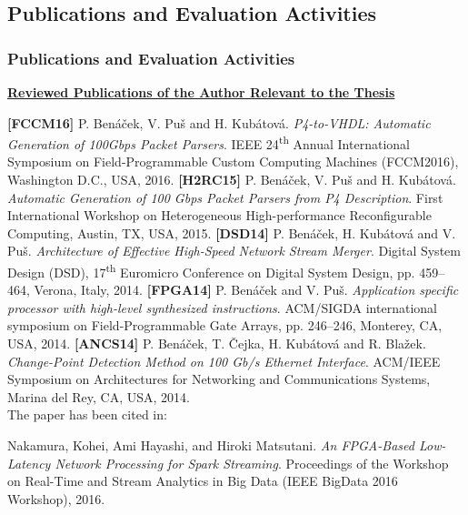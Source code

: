 \subsection*{Publications and Evaluation Activities}
\begin{frame}[allowframebreaks]
    \frametitle{Publications and Evaluation Activities}
    {
    \footnotesize
    \textbf{\underline{Reviewed Publications of the Author Relevant to the Thesis}}
    \begin{itemize}
        \fitem[$\rightarrow$] \textbf{[FCCM16]} P. Ben\'{a}\v{c}ek, V. Pu\v{s} and H. Kub\'{a}tov\'{a}.
        \textit{P4-to-VHDL: Automatic Generation of 100Gbps Packet Parsers}. IEEE 24\textsuperscript{th} Annual International Symposium on Field-Programmable Custom Computing Machines (FCCM2016), Washington D.C., USA, 2016.
        \fitem[$\rightarrow$] \textbf{[H2RC15]} P. Ben\'{a}\v{c}ek, V. Pu\v{s} and H. Kub\'{a}tov\'{a}. \textit{Automatic Generation of 100 Gbps Packet Parsers from P4 Description}.
        First International Workshop on Heterogeneous High-performance Reconfigurable Computing, Austin, TX, USA, 2015.
        \fitem[$\rightarrow$] \textbf{[DSD14]} P. Ben\'{a}\v{c}ek, H. Kub\'{a}tov\'{a} and V. Pu\v{s}. \textit{Architecture of Effective High-Speed Network Stream Merger}.
        Digital System Design (DSD), 17\textsuperscript{th} Euromicro Conference on Digital System Design, pp. 459--464, Verona, Italy, 2014.
        \fitem[$\rightarrow$] \textbf{[FPGA14]} P. Ben{\'a}{\v{c}}ek and V. Pu{\v{s}}.
        \textit{Application specific processor with high-level synthesized instructions}.
        ACM/SIGDA international symposium on Field-Programmable Gate Arrays, pp. 246--246, Monterey, CA, USA,
        2014.
        \fitem[$\rightarrow$] \textbf{[ANCS14]} P. Ben\'{a}\v{c}ek, T. \v{C}ejka, H. Kub\'{a}tov\'{a} and R. Bla\v{z}ek.
        \textit{Change-Point Detection Method on 100 Gb/s Ethernet Interface}.
        ACM/IEEE Symposium on Architectures for Networking and Communications Systems, Marina del Rey, CA, USA,
        2014.
        \smallskip \\ The paper has been cited in:
        \begin{itemize}
            \footnotesize
            \fitem Nakamura, Kohei, Ami Hayashi, and Hiroki Matsutani. \textit{An FPGA-Based Low-Latency Network Processing for Spark Streaming}. Proceedings of the Workshop on Real-Time and Stream Analytics in Big Data (IEEE BigData 2016 Workshop), 2016.

\end{itemize}
\end{itemize}}
\end{frame}
